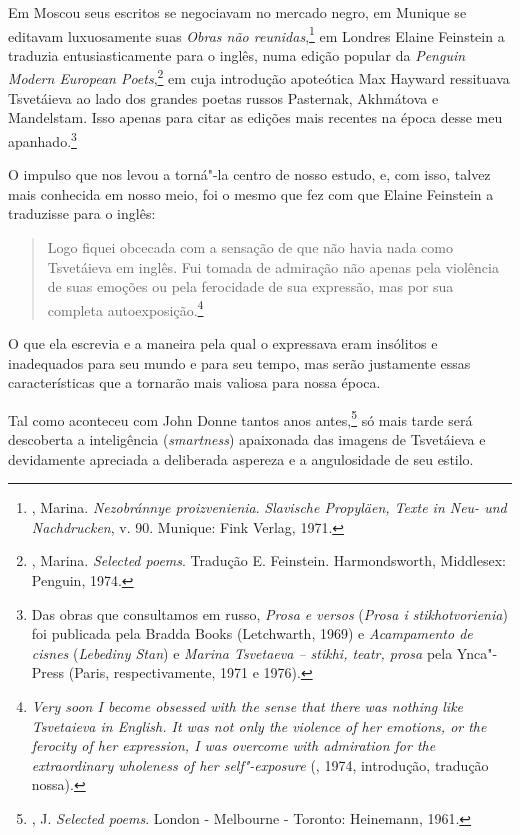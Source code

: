 Em Moscou seus escritos se negociavam no mercado negro, em Munique
se editavam luxuosamente suas \emph{Obras não
reunidas},\footnote{, Marina. \emph{Nezobránnye
proizvenienia}. \emph{Slavische Propyläen, Texte in Neu- und
Nachdrucken}, v. 90. Munique: Fink Verlag, 1971.} em Londres
Elaine Feinstein a traduzia entusiasticamente para o inglês,
numa edição popular da \emph{Penguin Modern European
Poets},\footnote{, Marina. \emph{Selected
poems}. Tradução E. Feinstein. Harmondsworth, Middlesex:
Penguin, 1974.} em cuja introdução apoteótica Max Hayward
ressituava Tsvetáieva ao lado dos grandes poetas russos
Pasternak, Akhmátova e Mandelstam. Isso apenas para citar
as edições mais recentes na época desse meu apanhado.\footnote{Das
obras que consultamos em russo, \emph{Prosa e versos} (\emph{Prosa
i stikhotvorienia}) foi publicada pela Bradda Books (Letchwarth,
1969) e \emph{Acampamento de cisnes} (\emph{Lebediny Stan}) e
\emph{Marina Tsvetaeva -- stikhi, teatr, prosa} pela Ynca"-Press
(Paris, respectivamente, 1971 e 1976).}

O impulso que nos levou a torná"-la centro de nosso estudo, e,
com isso, talvez mais conhecida em nosso meio, foi o mesmo que
fez com que Elaine Feinstein a traduzisse para o inglês:

\begin{quotation}
Logo fiquei obcecada com a sensação de que não havia nada como
Tsvetáieva em inglês. Fui tomada de admiração não apenas pela
violência de suas emoções ou pela ferocidade de sua expressão,
mas por sua completa autoexposição.\footnote{\emph{Very soon I
become obsessed with the sense that there was nothing like
Tsvetaieva in English. It was not only the violence of her
emotions, or the ferocity of her expression, I was overcome
with admiration for the extraordinary wholeness of her
self"-exposure} (, 1974, introdução,
tradução nossa).}
\end{quotation}

O que ela escrevia e a maneira pela qual o expressava eram
insólitos e inadequados para seu mundo e para seu tempo, mas
serão justamente essas características que a tornarão mais
valiosa para nossa época.

Tal como aconteceu com John Donne tantos anos
antes,\footnote{, J. \emph{Selected poems}.
London - Melbourne - Toronto: Heinemann, 1961.} só mais tarde
será descoberta a inteligência (\emph{smartness}) apaixonada
das imagens de Tsvetáieva e devidamente apreciada a
deliberada aspereza e a angulosidade de seu estilo.


